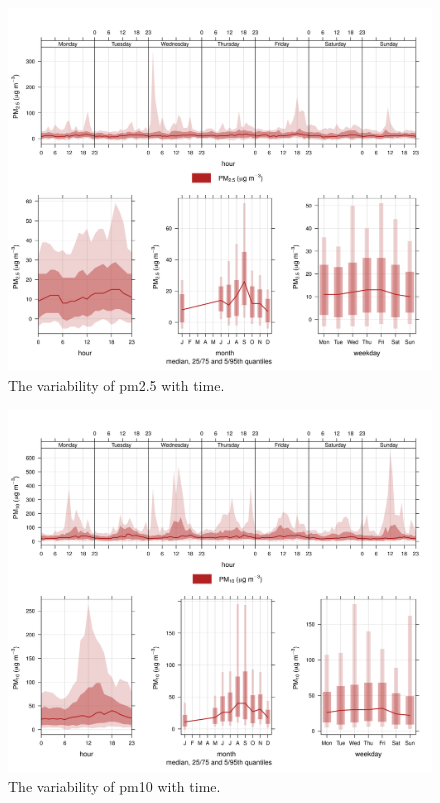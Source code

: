 \documentclass{nwureport}
\begin{document}
\begin{figure}[!htb]
    \centering
    \includegraphics[width=\textwidth]{images/Wedela_PM2-5_timevary.png}
    \caption[The variability of $PM_{2.5}$ with time.]{The variability of \gls{pm2.5} with time.}
    \label{fig:summary}
\end{figure}

\begin{figure}[!htb]
    \centering
    \includegraphics[width=\textwidth]{images/Wedela_PM10_timevary.png}
    \caption[The variability of $PM_{10}$ with time.]{The variability of \gls{pm10} with time.}
    \label{fig:summary}
\end{figure}
\end{document}
